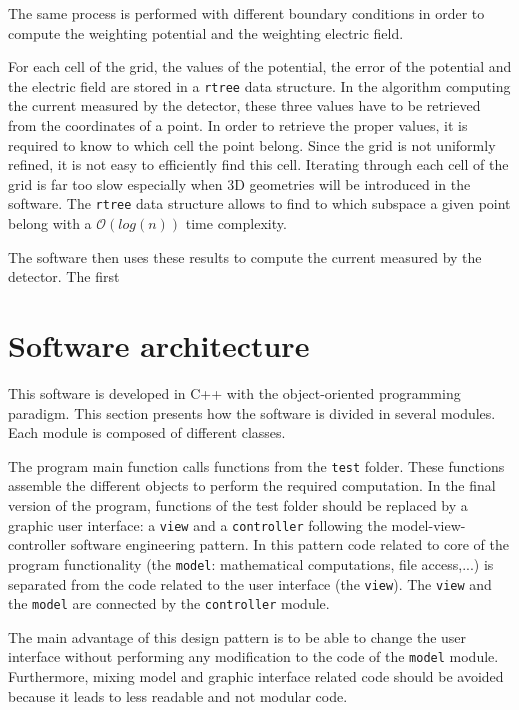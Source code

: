 \documentclass[11pt]{article}
\begin{document}
The same process is performed with different boundary conditions in order
to compute the weighting potential and the weighting electric field.

For each cell of the grid, the values of the potential, the error of the
potential and the electric field are stored in a \texttt{rtree} data structure.
In the algorithm computing the current measured by the detector, these three
values have to be retrieved from the coordinates of a point. In order to retrieve the proper
values, it is required to know to which cell the point belong. Since the grid
is not uniformly refined, it is not easy to efficiently find this cell.
Iterating through each cell of the grid is far too slow especially when 3D
geometries will be introduced in the software. The \texttt{rtree} data structure
allows to find to which subspace a given point belong with a $\mathcal{O}(log(n))$ time complexity.

The software then uses these results to compute the current measured by the
detector. The first 

\section{Software architecture}

This software is developed in C++ with the object-oriented programming paradigm.
This section presents how the software is divided in several modules. Each module
is composed of different classes.

The program main function calls functions from the \texttt{test} folder. These functions
assemble the different objects to perform the required computation. In the
final version of the program, functions of the test folder should be replaced
by a graphic user interface: a \texttt{view} and a \texttt{controller} following
the model-view-controller software engineering pattern. In this pattern code
related to core of the program functionality (the \texttt{model}: mathematical computations, file access,...)
is separated from the code related to the user interface (the \texttt{view}).
The \texttt{view} and the
\texttt{model} are connected by the \texttt{controller} module.

The main advantage of this design pattern is to be able to change the user interface without
performing any modification to the code of the \texttt{model} module. Furthermore,
mixing model and graphic interface related code should be avoided because it leads to
less readable and not modular code.
\end{document}

